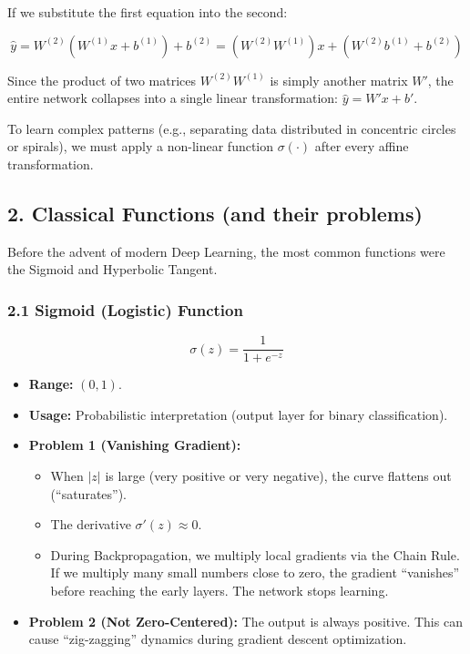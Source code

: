 \documentclass[
  italian,
  11pt,
]{article}
\begin{document}
If we substitute the first equation into the second:

\[\hat{y} = W^{(2)} (W^{(1)} x + b^{(1)}) + b^{(2)} = (W^{(2)} W^{(1)}) x + (W^{(2)} b^{(1)} + b^{(2)})\]

Since the product of two matrices \(W^{(2)} W^{(1)}\) is simply another
matrix \(W'\), the entire network collapses into a single linear
transformation: \(\hat{y} = W' x + b'\).

To learn complex patterns (e.g., separating data distributed in
concentric circles or spirals), we must apply a non-linear function
\(\sigma(\cdot)\) after every affine transformation.

\subsection{2. Classical Functions (and their
problems)}\label{classical-functions-and-their-problems}

Before the advent of modern Deep Learning, the most common functions
were the Sigmoid and Hyperbolic Tangent.

\subsubsection{2.1 Sigmoid (Logistic)
Function}\label{sigmoid-logistic-function}

\[\sigma(z) = \frac{1}{1 + e^{-z}}\]

\begin{itemize}
\item
  \textbf{Range:} \((0, 1)\).
\item
  \textbf{Usage:} Probabilistic interpretation (output layer for binary
  classification).
\item
  \textbf{Problem 1 (Vanishing Gradient):}

  \begin{itemize}
  \item
    When \(|z|\) is large (very positive or very negative), the curve
    flattens out (``saturates'').
  \item
    The derivative \(\sigma'(z) \approx 0\).
  \item
    During Backpropagation, we multiply local gradients via the Chain
    Rule. If we multiply many small numbers close to zero, the gradient
    ``vanishes'' before reaching the early layers. The network stops
    learning.
  \end{itemize}
\item
  \textbf{Problem 2 (Not Zero-Centered):} The output is always positive.
  This can cause ``zig-zagging'' dynamics during gradient descent
  optimization.
\end{itemize}
\end{document}

